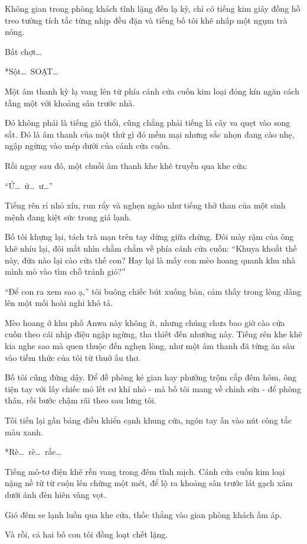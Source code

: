 \documentclass[../main.tex]{subfiles}
\begin{document}
Không gian trong phòng khách tĩnh lặng đến lạ kỳ, chỉ có tiếng kim giây đồng hồ treo tường tích tắc từng nhịp đều đặn và tiếng bố tôi khẽ nhấp một ngụm trà nóng.

Bất chợt\dots

*Sột\dots\ SOẠT\dots*

Một âm thanh kỳ lạ vang lên từ phía cánh cửa cuốn kim loại đóng kín ngăn cách tầng một với khoảng sân trước nhà.

Đó không phải là tiếng gió thổi, cũng chẳng phải tiếng lá cây va quẹt vào song sắt. Đó là âm thanh của một thứ gì đó mềm mại nhưng sắc nhọn đang cào nhẹ, ngập ngừng vào mép dưới của cánh cửa cuốn.

Rồi ngay sau đó, một chuỗi âm thanh khe khẽ truyền qua khe cửa:

``Ử\dots\ ử\dots\ ư\dots''

Tiếng rên rỉ nhỏ xíu, run rẩy và nghẹn ngào như tiếng thở than của một sinh mệnh đang kiệt sức trong giá lạnh.

Bố tôi khựng lại, tách trà mạn trên tay dừng giữa chừng. Đôi mày rậm của ông khẽ nhíu lại, đôi mắt nhìn chằm chằm về phía cánh cửa cuốn: ``Khuya khoắt thế này, đứa nào lại cào cửa thế con? Hay lại là mấy con mèo hoang quanh khu nhà mình mò vào tìm chỗ tránh gió?''

``Để con ra xem sao ạ,'' tôi buông chiếc bút xuống bàn, cảm thấy trong lòng dâng lên một mối hoài nghi khó tả.

Mèo hoang ở khu phố Anwa này không ít, nhưng chúng chưa bao giờ cào cửa cuốn theo cái nhịp điệu ngập ngừng, tha thiết đến nhường này. Tiếng rên khe khẽ kia nghe sao mà quen thuộc đến nghẹn lòng, như một âm thanh đã từng ăn sâu vào tiềm thức của tôi từ thuở ấu thơ.

Bố tôi cũng đứng dậy. Để đề phòng kẻ gian hay phường trộm cắp đêm hôm, ông tiện tay với lấy chiếc mỏ lết cơ khí nhỏ - mà bố tôi mang về chỉnh sửa - để phòng thân, rồi bước chậm rãi theo sau lưng tôi.

Tôi tiến lại gần bảng điều khiển cạnh khung cửa, ngón tay ấn vào nút công tắc màu xanh.

*Rè\dots\ rè\dots\ rắc\dots*

Tiếng mô-tơ điện khẽ rền vang trong đêm tĩnh mịch. Cánh cửa cuốn kim loại nặng nề từ từ cuộn lên chừng một mét, để lộ ra khoảng sân trước lát gạch xám dưới ánh đèn hiên vàng vọt.

Gió đêm se lạnh luồn qua khe cửa, thốc thẳng vào gian phòng khách ấm áp.

Và rồi, cả hai bố con tôi đồng loạt chết lặng.
\end{document}
